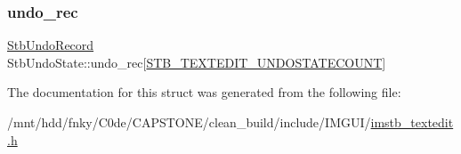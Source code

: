 \subsubsection{\texorpdfstring{undo\+\_\+rec}{undo\_rec}}
{\footnotesize\ttfamily \hyperlink{structStbUndoRecord}{Stb\+Undo\+Record} Stb\+Undo\+State\+::undo\+\_\+rec\mbox{[}\hyperlink{imstb__textedit_8h_afa79483143df87a1497010712b3dfaf9}{S\+T\+B\+\_\+\+T\+E\+X\+T\+E\+D\+I\+T\+\_\+\+U\+N\+D\+O\+S\+T\+A\+T\+E\+C\+O\+U\+NT}\mbox{]}}



The documentation for this struct was generated from the following file\+:\begin{DoxyCompactItemize}
\item 
/mnt/hdd/fnky/\+C0de/\+C\+A\+P\+S\+T\+O\+N\+E/clean\+\_\+build/include/\+I\+M\+G\+U\+I/\hyperlink{imstb__textedit_8h}{imstb\+\_\+textedit.\+h}\end{DoxyCompactItemize}
